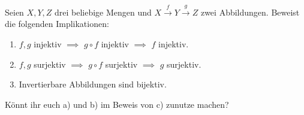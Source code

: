 \begin{aufg} \label{aufg:bijektiviso}
    Seien $X,Y,Z$ drei beliebige Mengen und $X \xrightarrow{f} Y \xrightarrow{g} Z$ zwei Abbildungen. Beweist die folgenden Implikationen:
    \begin{enumerate}
        \item $f,g$ injektiv $\implies$ $g\circ f$ injektiv $\implies$ $f$ injektiv.
        \item $f,g$ surjektiv $\implies$ $g\circ f$ surjektiv $\implies$ $g$ surjektiv.
        \item Invertierbare Abbildungen sind bijektiv.
    \end{enumerate}
    Könnt ihr euch a) und b) im Beweis von c) zunutze machen?
\end{aufg}

